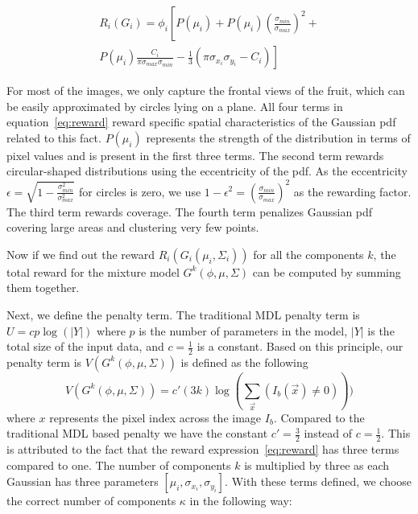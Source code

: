 \begin{equation}
\begin{split}
R_i(G_{i}) =  \phi_{i}\left[ P(\mu_{i})+  P(\mu_{i})\left(\frac{\sigma_{min}}{\sigma_{max}}\right)^2 +\right. \\ \left.  P(\mu_{i})\frac{C_{i}}{\pi \sigma_{max}\sigma_{min}} - \frac{1}{3}\left( \pi\sigma_{x_{i}}\sigma_{y_{i}} -C_{i} \right) \right]
\end{split}
\label{eq:reward}
\end{equation}

For most of the images, we only capture the frontal views of the fruit, which can be easily approximated by circles lying on a plane. All four terms in equation~\eqref{eq:reward} reward specific spatial characteristics of the Gaussian pdf related to this fact. $P(\mu_{i})$ represents the strength of the distribution in terms of pixel values and is present in the first three terms. The second term rewards circular-shaped distributions using the eccentricity of the pdf. As the eccentricity $\epsilon = \sqrt{1- \frac{\sigma_{min}^2}{\sigma_{max}^2}}$ for circles is zero, we use $1-\epsilon^2 = \left(\frac{\sigma_{min}}{\sigma_{max}}\right)^2$ as the rewarding factor. The third term rewards coverage. The fourth term penalizes Gaussian pdf covering large areas and clustering very few points.

Now if we find out the reward $R_i(G_{i}(\mu_i,\Sigma_i))$ for all the components $k$, the total reward for the mixture model $G^k(\phi,\mu,\Sigma)$ can be computed by summing them together.



Next, we define the penalty term. The traditional MDL penalty term is $U = c p \log(|Y|)$ where $p$ is the number of parameters in the model, $|Y|$ is the total size of the input data, and $c = \frac{1}{2}$ is a constant. Based on this principle, our penalty term is  $V(G^k(\phi,\mu,\Sigma))$ is defined as the following
\begin{equation}
V(G^k(\phi,\mu,\Sigma)) = c'(3k) \log(\sum_{\vec{x}}(I_b(\vec{x}) \neq 0)))
\label{eq:penalty}
\end{equation}
where $x$ represents the pixel index across the image $I_b$. Compared to the traditional MDL based penalty we have the constant $c' =\frac{3}{2}$ instead of $c =\frac{1}{2}$. This is attributed to the fact that the reward expression~\eqref{eq:reward} has three terms compared to one. The number of components $k$ is multiplied by three as each Gaussian has three parameters $\left[\mu_i,\sigma_{x_i}, \sigma_{y_i}\right]$. With these terms defined, we choose the correct number of components $\kappa$ in the following way:

